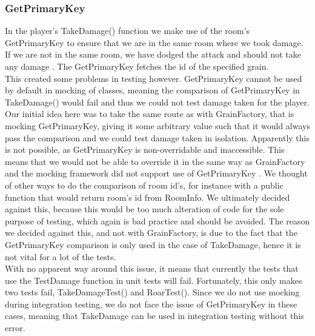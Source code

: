 \subsubsection{GetPrimaryKey}
In the player's TakeDamage() function we make use of the room's GetPrimaryKey to ensure that we are in the same room where we took damage. If we are not in the same room, we have dodged the attack and should not take any damage . The GetPrimaryKey fetches the id of the specified grain. \\
This created some problems in testing however. GetPrimaryKey cannot be used by default in mocking of classes, meaning the comparison of GetPrimaryKey in TakeDamage() would fail and thus we could not test damage taken for the player. \\
Our initial idea here was to take the same route as with GrainFactory, that is mocking GetPrimaryKey, giving it some arbitrary value such that it would always pass the comparison and we could test damage taken in isolation. Apparently this is not possible, as GetPrimaryKey is non-overridable and inaccessible. This means that we would not be able to override it in the same way as GrainFactory and the mocking framework did not support use of GetPrimaryKey . We thought of other ways to do the comparison of room id's, for instance with a public function that would return room's id from RoomInfo. We ultimately decided against this, because this would be too much alteration of code for the sole purpose of testing, which again is bad practice and should be avoided. The reason we decided against this, and not with GrainFactory, is due to the fact that the GetPrimaryKey comparison is only used in the case of TakeDamage, hence it is not vital for a lot of the tests. \\
With no apparent way around this issue, it means that currently the tests that use the TestDamage function in unit tests will fail. Fortunately, this only makes two tests fail, TakeDamageTest() and RoarTest(). Since we do not use mocking during integration testing, we do not face the issue of GetPrimaryKey in these cases, meaning that TakeDamage can be used in integration testing without this error. 
